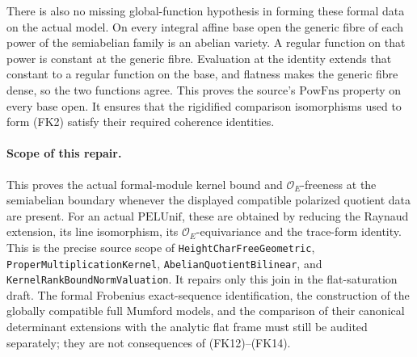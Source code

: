 There is also no missing global-function hypothesis in forming
these formal data on the actual model.
On every integral affine base open the generic fibre of each
power of the semiabelian family is an abelian variety.
A regular function on that power is constant at the generic
fibre.  Evaluation at the identity extends that constant to a
regular function on the base, and flatness makes the generic
fibre dense, so the two functions agree.
This proves the source's \(\mathrm{PowFns}\) property on
every base open.  It ensures that the rigidified comparison
isomorphisms used to form (FK2) satisfy their required
coherence identities.

\paragraph{Scope of this repair.}
This proves the actual formal-module kernel bound and
\(\mathcal O_E\)-freeness at the semiabelian boundary whenever
the displayed compatible polarized quotient data are present.
For an actual \(\mathrm{PELUnif}\), these are obtained by
reducing the Raynaud extension, its line isomorphism,
its \(\mathcal O_E\)-equivariance and the trace-form identity.
This is the precise source scope of
\texttt{HeightCharFreeGeometric},
\texttt{ProperMultiplicationKernel},
\texttt{AbelianQuotientBilinear}, and
\texttt{KernelRankBoundNormValuation}.
It repairs only this join in the flat-saturation draft.
The formal Frobenius exact-sequence identification,
the construction of the globally compatible full Mumford models,
and the comparison of their canonical determinant extensions
with the analytic flat frame must still be audited separately;
they are not consequences of (FK12)--(FK14).
